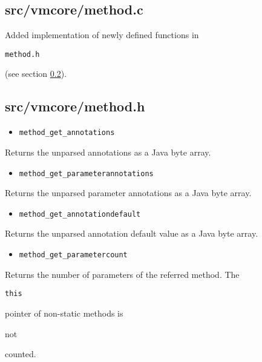 \documentclass[a4paper, 10pt, titlepage]{scrartcl} %
\begin{document}
\subsection{src/vmcore/method.c}
\label{sec:src/vmcore/method.c}

Added implementation of newly defined functions in \begin{scriptsize}\verb|method|\hspace{0.0pt}\verb|.|\hspace{0.0pt}\verb|h|\end{scriptsize} (see section \ref{sec:src/vmcore/method.h}).

\subsection{src/vmcore/method.h}
\label{sec:src/vmcore/method.h}

\begin{itemize}
 \item \begin{scriptsize}\verb|method_get_annotations|\end{scriptsize}
\end{itemize}
Returns the unparsed annotations as a Java byte array.

\begin{itemize}
 \item \begin{scriptsize}\verb|method_get_parameterannotations|\end{scriptsize}
\end{itemize}
Returns the unparsed parameter annotations as a Java byte array.

\begin{itemize}
 \item \begin{scriptsize}\verb|method_get_annotationdefault|\end{scriptsize}
\end{itemize}
Returns the unparsed annotation default value as a Java byte array.

\begin{itemize}
 \item \begin{scriptsize}\verb|method_get_parametercount|\end{scriptsize}
\end{itemize}
Returns the number of parameters of the referred method. The \begin{scriptsize}\verb|this|\end{scriptsize} pointer
of non-static methods is \begin{bfseries}not\end{bfseries} counted.
\end{document}
